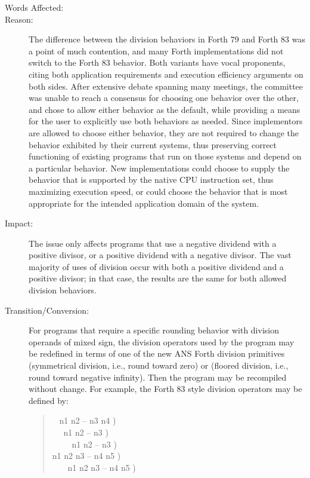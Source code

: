 \begin{description}
\item[Words Affected:]
	\word{/}				
		\word{*/}

\item[Reason:]
	The difference between the division behaviors in Forth 79 and
	Forth 83 was a point of much contention, and many Forth
	implementations did not switch to the Forth 83 behavior. Both
	variants have vocal proponents, citing both application
	requirements and execution efficiency arguments on both sides.
	After extensive debate spanning many meetings, the committee was
	unable to reach a consensus for choosing one behavior over the
	other, and chose to allow either behavior as the default, while
	providing a means for the user to explicitly use both behaviors
	as needed. Since implementors are allowed to choose either
	behavior, they are not required to change the behavior exhibited
	by their current systems, thus preserving correct functioning of
	existing programs that run on those systems and depend on a
	particular behavior. New implementations could choose to supply
	the behavior that is supported by the native CPU instruction set,
	thus maximizing execution speed, or could choose the behavior
	that is most appropriate for the intended application domain of
	the system.

\item[Impact:]
	The issue only affects programs that use a negative dividend with
	a positive divisor, or a positive dividend with a negative divisor.
	The vast majority of uses of division occur with both a positive
	dividend and a positive divisor; in that case, the results are the
	same for both allowed division behaviors.

\item[Transition/Conversion:]
	For programs that require a specific rounding behavior with division
	operands of mixed sign, the division operators used by the program
	may be redefined in terms of one of the new ANS Forth division
	primitives  (symmetrical division, i.e., round toward
	zero) or  (floored division, i.e., round toward
	negative infinity). Then the program may be recompiled without
	change. For example, the Forth 83 style division operators may be
	defined by:
	\begin{quote}\ttfamily
		\word{:} ~  n1 n2 -- n3 n4 ) ~~
			    \word{;} \\
		\word{:} ~~  n1 n2 -- n3 ) ~~~~~
			   \word{;} \\
		\word{:} \word{/}~~~~  n1 n2 -- n3 ) ~~~~~
			    \word{;} \\
		\word{:}   n1 n2 n3 -- n4 n5 )
			    \word{;} \\
		\word{:} \word{*/}~~~  n1 n2 n3 -- n4 n5 )
			    \word{;} \\
	\end{quote}
\end{description}


